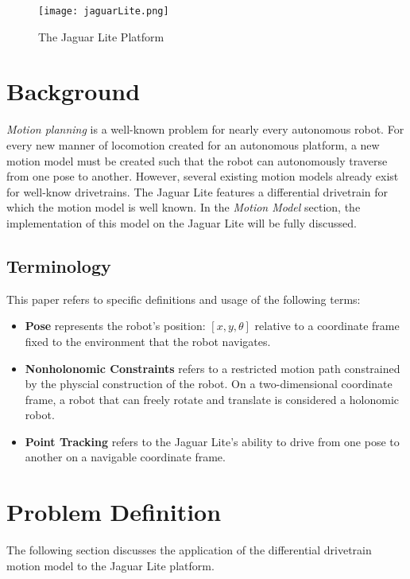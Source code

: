 \documentclass[conference]{IEEEtran}
\begin{document}
\begin{figure}[h]
\centering
\texttt{[image: jaguarLite.png]}
\caption{The Jaguar Lite Platform}
\label{fig1}
\end{figure}

\section{Background}
\emph{Motion planning} is a well-known problem for
nearly every autonomous robot.  For every new manner of locomotion created 
for an autonomous platform, a new motion model must be created such that 
the robot can autonomously traverse from one pose to another.   
However, several existing motion models already exist for well-know 
drivetrains.  The Jaguar Lite features a differential drivetrain for 
which the motion model is well known. In the \emph{Motion Model} section,
the implementation of this model on the Jaguar Lite will be fully
discussed.    

\subsection{Terminology}
This paper refers to specific definitions and usage of the following terms:

\begin{itemize}
\item \noindent \textbf{Pose} represents the robot's position: $[x,y,\theta]$ relative to a 
coordinate frame fixed to the environment that the robot navigates.
 
\item \noindent \textbf{Nonholonomic Constraints} refers to a restricted motion path 
constrained by the physcial construction of the robot.  On a two-dimensional coordinate 
frame, a robot that can freely
rotate and translate is considered a holonomic robot. 

\item \noindent \textbf{Point Tracking} refers to the Jaguar Lite's ability to drive
from one pose to another on a navigable coordinate frame.

\end{itemize}
\section{Problem Definition}
The following section discusses the application of the differential drivetrain 
motion model to the Jaguar Lite platform.   
\end{document}
